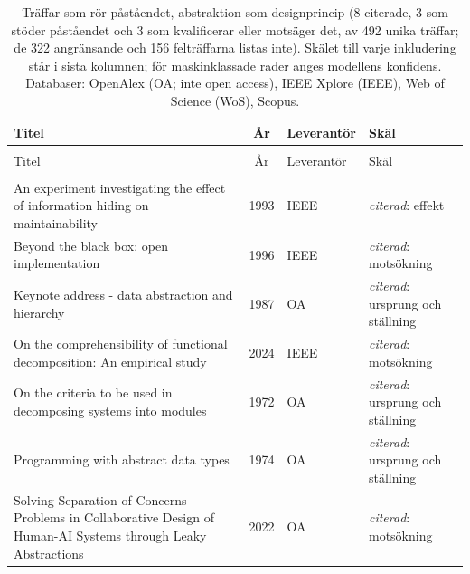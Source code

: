 
\begingroup\footnotesize
\begin{longtable}{@{}%
  >{\raggedright\arraybackslash}p{}c%
  >{\raggedright\arraybackslash}p{}%
  >{\raggedright\arraybackslash}p{}@{}}
\caption{Träffar som rör påståendet, abstraktion som designprincip (8 citerade, 3 som stöder påståendet och 3 som kvalificerar eller motsäger det, av 492 unika träffar; de 322 angränsande och 156 felträffarna listas inte). Skälet till varje inkludering står i sista kolumnen; för maskinklassade rader anges modellens konfidens. Databaser: OpenAlex (OA; inte open access), IEEE Xplore (IEEE), Web of Science (WoS), Scopus.}\label{tab:sok-abstraktion}\\
\toprule
Titel & År & Leverantör & Skäl \\
\midrule
\endfirsthead
\multicolumn{4}{@{}l}{\emph{\tablename~\thetable{} (forts.)}}\\
\toprule
Titel & År & Leverantör & Skäl \\
\midrule
\endhead
\midrule \multicolumn{4}{r@{}}{\emph{forts.\ på nästa sida}}\\
\endfoot
\bottomrule
\endlastfoot
An experiment investigating the effect of information hiding on maintainability & 1993 & IEEE & \emph{citerad}: effekt \\
Beyond the black box: open implementation & 1996 & IEEE & \emph{citerad}: motsökning \\
Keynote address - data abstraction and hierarchy & 1987 & OA & \emph{citerad}: ursprung och ställning \\
On the comprehensibility of functional decomposition: An empirical study & 2024 & IEEE & \emph{citerad}: motsökning \\
On the criteria to be used in decomposing systems into modules & 1972 & OA & \emph{citerad}: ursprung och ställning \\
Programming with abstract data types & 1974 & OA & \emph{citerad}: ursprung och ställning \\
Solving Separation-of-Concerns Problems in Collaborative Design of Human-AI Systems through Leaky Abstractions & 2022 & OA & \emph{citerad}: motsökning \\

\end{longtable}
